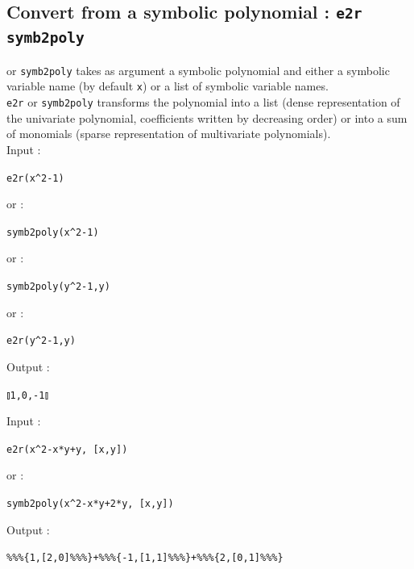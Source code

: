 \documentclass[a4paper,11pt]{book}
\begin{document}
\subsection{Convert from a symbolic polynomial : {\tt e2r symb2poly}}
 or {\tt symb2poly} takes as argument a symbolic polynomial 
and either a symbolic variable name (by default {\tt x}) or
a list of symbolic variable names.\\
{\tt e2r} or {\tt symb2poly} transforms the polynomial into a list 
(dense representation of the univariate polynomial, coefficients
written by decreasing order) or into a sum of monomials (sparse
representation of multivariate polynomials).\\
Input :
\begin{center}{\tt e2r(x\verb|^|2-1)}\end{center}
or :
\begin{center}{\tt symb2poly(x\verb|^|2-1)}\end{center}
or :
\begin{center}{\tt symb2poly(y\verb|^|2-1,y)}\end{center}
or :
\begin{center}{\tt e2r(y\verb|^|2-1,y)}\end{center}
Output :
\begin{center}{\tt $\talloblong$1,0,-1$\talloblong$}\end{center}
Input :
\begin{center}{\tt e2r(x\verb|^|2-x*y+y, [x,y])}\end{center}
or :
\begin{center}{\tt symb2poly(x\verb|^|2-x*y+2*y, [x,y])}\end{center}
Output :
\begin{center}{\tt \%\%\%\{1,[2,0]\%\%\%\}+\%\%\%\{-1,[1,1]\%\%\%\}+\%\%\%\{2,[0,1]\%\%\%\}}\end{center}
\end{document}
